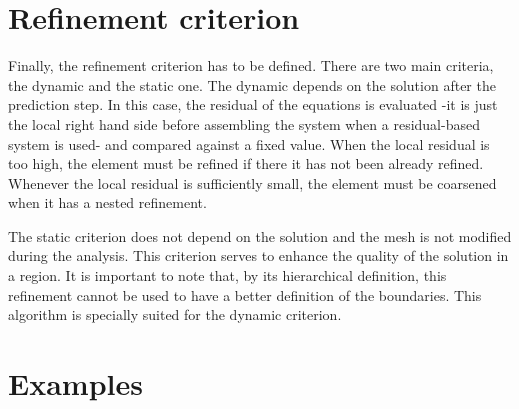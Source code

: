 \section{Refinement criterion}

Finally, the refinement criterion has to be defined. There are two main criteria, the dynamic and the static one. The dynamic depends on the solution after the prediction step. In this case, the residual of the equations is evaluated -it is just the local right hand side before assembling the system when a residual-based system is used- and compared against a fixed value. When the local residual is too high, the element must be refined if there it has not been already refined. Whenever the local residual is sufficiently small, the element must be coarsened when it has a nested refinement.

The static criterion does not depend on the solution and the mesh is not modified during the analysis. This criterion serves to enhance the quality of the solution in a region. It is important to note that, by its hierarchical definition,  this refinement cannot be used to have a better definition of the boundaries. This algorithm is specially suited for the dynamic criterion.


\section{Examples}



